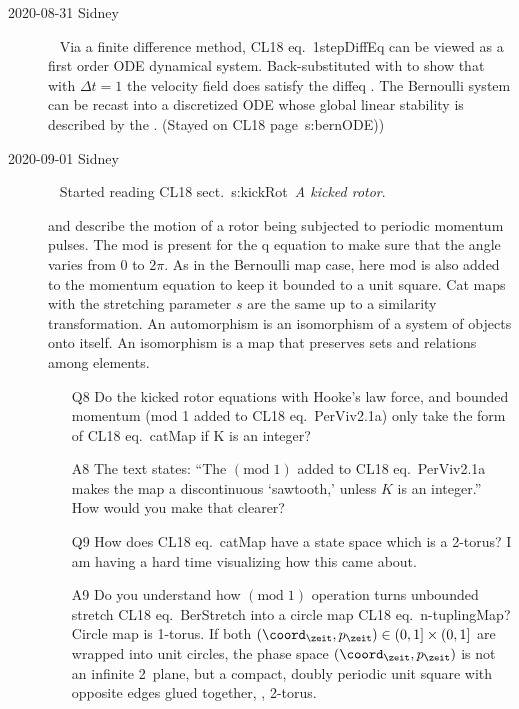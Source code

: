 \begin{description}
\item[2020-08-31 Sidney]~
Via a finite difference method, CL18 eq.~{1stepDiffEq} can be viewed as a
first order ODE dynamical system. Back-substituted with 
to show that with $\Delta t=1$ the velocity field does satisfy the diffeq
.
The Bernoulli system can be recast into a discretized ODE whose global
linear stability is described by the {\jacobianOrb}.
(Stayed on CL18 page~{s:bernODE}))

\item[2020-09-01 Sidney]~
Started reading CL18 sect.~{s:kickRot}~{\em A kicked rotor}.

and  describe the motion of a rotor being subjected to
periodic momentum pulses. The mod is present for the q equation to make
sure that the angle varies from $0$ to $2\pi$. As in the Bernoulli map case,
here
mod is also added to the momentum equation to keep it bounded to a unit
square. Cat maps with the stretching parameter ${s}$ are the same up to a
similarity transformation. An automorphism is an isomorphism of a system
of objects onto itself. An isomorphism is a map that preserves sets and
relations among elements.

\begin{itemize}
	\item[Q8]
Do the kicked rotor equations with Hooke's law force, and bounded momentum (mod 1 added to CL18 eq.~{PerViv2.1a}) only take the form of CL18 eq.~{catMap} if K is an integer?
	\item[A8]
The text states: ``The
$(\mbox{mod}\;1)$ added to CL18 eq.~{PerViv2.1a} makes the map a
discontinuous `sawtooth,' unless $K$ is an integer.'' How would you make that clearer?
	\item[Q9]
How does CL18 eq.~{catMap} have a state space which is a 2-torus? I am having a hard time visualizing how this came about.
	\item[A9]
Do you understand how  $(\mbox{mod}\;1)$ operation turns unbounded stretch
CL18 eq.~{BerStretch} into a circle map CL18 eq.~{n-tuplingMap}? Circle map is
1-torus. If both
\(
(\coord_{\zeit},p_{\zeit}) \in  (0,1]\times(0,1]
\)
are wrapped into unit circles, the phase space $(\coord_{\zeit},p_{\zeit})$
is not an infinite 2\dmn\ plane, but a compact, doubly periodic unit square with
opposite edges glued together, \ie, 2-torus.
\end{itemize}



\end{description}

